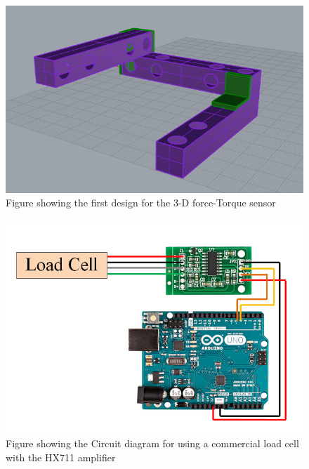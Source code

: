 \begin{figure}[p]%
	\centering
	\includegraphics[width=\linewidth]{figures/ch3/loadcelldesign}
	\caption{Figure showing the first design for the 3-D force-Torque sensor}
	\label{fig:3dlc}
\end{figure}
\begin{figure}[p]%
	\centering
	\includegraphics[width=\linewidth]{figures/ch3/sparkfun}
	\caption{Figure showing the Circuit diagram for using a commercial load cell with the HX711 amplifier \cite{Degraw2017}}
	\label{fig:sparkfun}
\end{figure}

\newpage



